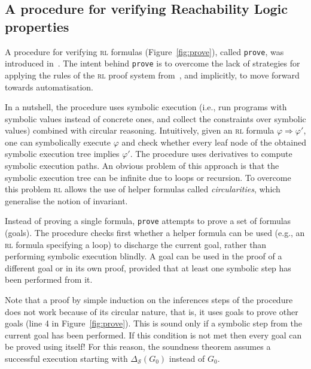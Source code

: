 \documentclass[conference]{IEEEtran}
\newenvironment{todo}{\medskip\hrule\smallskip\noindent}{\smallskip\hrule\medskip}
\newcommand{\vr}[1]{\begin{todo}\textcolor{blue}{Vlad:}\\ \color{orange}{#1}\color{black}\end{todo}}
\newcommand{\vr}[1]{}
\renewcommand{\S}{\mathcal{S}}
\newcommand{\Ra}{\Rightarrow}
\newcommand{\RL}{\textsc{rl}\xspace}
\newcommand{\rarule}[2]{{#1} \Ra{#2}}
\begin{document}

\subsection{A procedure for verifying Reachability Logic properties}
\label{sec:prove}


A procedure for verifying \RL formulas (Figure~\ref{fig:prove}), called \texttt{prove}, was introduced in~\cite{lucanu-rusu-arusoaie-nowak-LRC2015}.
The intent behind \texttt{prove} is to overcome the lack of strategies for applying the rules of the \RL proof system from~\cite{stefanescu-ciobaca-mereuta-moore-serbanuta-rosu-2014-rta}, and implicitly, to move forward towards automatisation.

In a nutshell, the procedure uses symbolic execution (i.e., run programs with symbolic values instead of concrete ones, and collect the constraints over symbolic values) combined with circular reasoning.
Intuitively, given an \RL formula $\rarule{\varphi}{\varphi'}$, one can symbolically execute $\varphi$ and check whether every leaf node of the obtained symbolic execution tree implies $\varphi'$.
The procedure uses derivatives to compute symbolic execution paths.
An obvious problem of this approach is that the symbolic execution tree can be infinite due to loops or recursion.
To overcome this problem \RL allows the use of helper formulas called \emph{circularities}, which generalise the notion of invariant.

Instead of proving a single formula, \texttt{prove} attempts to prove a set of formulas (goals). 
The procedure checks first whether a helper formula can be used (e.g., an \RL formula specifying a loop) to discharge the current goal, rather than performing symbolic execution blindly. 
A goal can be used in the proof of a different goal or in its own proof, provided that at least one symbolic step has been performed from it.

Note that a proof by simple induction on the inferences steps of the procedure does not work because of its circular nature, that is, it uses goals to prove other goals (line 4 in Figure~\ref{fig:prove}).
This is sound only if a symbolic step from the current goal has been performed. 
If this condition is not met then every goal can be proved using itself!
For this reason, the soundness theorem assumes a successful execution starting with $\Delta_\S(\!G_0\!)$ instead of $G_0$.
\end{document}

